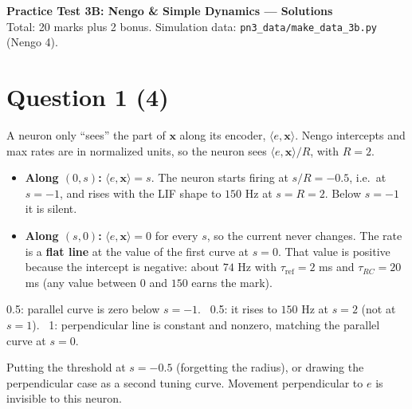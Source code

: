 \documentclass[11pt,letterpaper]{article}
\newcommand{\tref}{\tau_{\mathrm{ref}}}
\newcommand{\trc}{\tau_{RC}}
\newcommand{\ans}[1]{\par\vspace{4pt}{\bfseries #1}\quad}
\begin{document}
\begin{center}
{\Large\bfseries Practice Test 3B: Nengo \& Simple Dynamics --- Solutions}\\[2pt]
Total: 20 marks plus 2 bonus. Simulation data: \texttt{pn3\_data/make\_data\_3b.py} (Nengo 4).
\end{center}

\section*{Question 1 \hfill (4)}

\ans{(a) [2]}
A neuron only ``sees'' the part of $\mathbf x$ along its encoder, $\langle e, \mathbf x\rangle$. Nengo intercepts and max rates are in normalized units, so the neuron sees $\langle e, \mathbf x\rangle / R$, with $R = 2$.
\begin{itemize}[leftmargin=1.2em]
\item \textbf{Along $(0, s)$:} $\langle e, \mathbf x\rangle = s$. The neuron starts firing at $s/R = -0.5$, i.e.\ at $s = -1$, and rises with the LIF shape to $150$ Hz at $s = R = 2$. Below $s = -1$ it is silent.
\item \textbf{Along $(s, 0)$:} $\langle e, \mathbf x\rangle = 0$ for every $s$, so the current never changes. The rate is a \textbf{flat line} at the value of the first curve at $s = 0$. That value is positive because the intercept is negative: about $74$ Hz with $\tref = 2$ ms and $\trc = 20$ ms (any value between $0$ and $150$ earns the mark).
\end{itemize}
\begin{center}
\end{center}
\begin{marking}
0.5: parallel curve is zero below $s = -1$. \ 0.5: it rises to $150$ Hz at $s = 2$ (not at $s = 1$). \ 1: perpendicular line is constant and nonzero, matching the parallel curve at $s = 0$.
\end{marking}
\begin{trap}
Putting the threshold at $s = -0.5$ (forgetting the radius), or drawing the perpendicular case as a second tuning curve. Movement perpendicular to $e$ is invisible to this neuron.
\end{trap}
\end{document}
